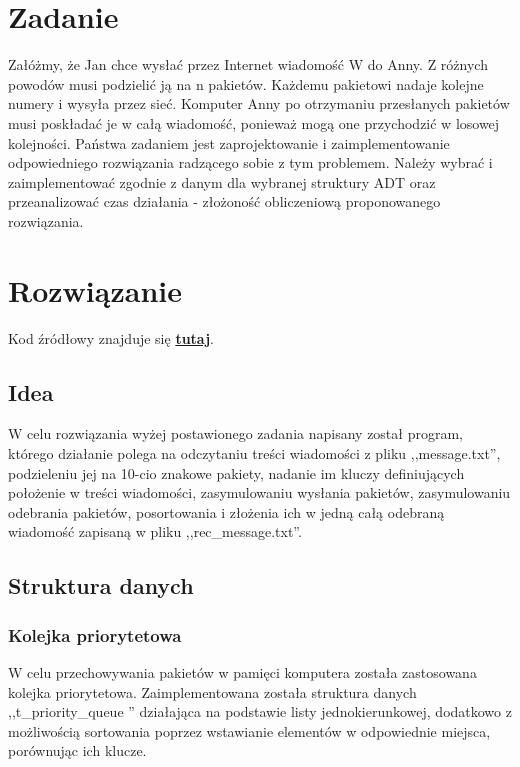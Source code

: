 \documentclass[12pt]{article}
\begin{document}
    


\section{Zadanie}


Załóżmy, że Jan chce wysłać przez Internet wiadomość W do Anny. Z różnych powodów musi podzielić
ją na n pakietów. Każdemu pakietowi nadaje kolejne numery i wysyła przez sieć. Komputer Anny po otrzymaniu
przesłanych pakietów musi poskładać je w całą wiadomość, ponieważ mogą one przychodzić w losowej
kolejności. Państwa zadaniem jest zaprojektowanie i zaimplementowanie odpowiedniego rozwiązania radzącego
sobie z tym problemem. Należy wybrać i zaimplementować zgodnie z danym dla wybranej struktury
ADT oraz przeanalizować czas działania - złożoność obliczeniową proponowanego rozwiązania.

\section{Rozwiązanie}

Kod źródłowy znajduje się  \href{https://github.com/PartyKusZ/PAMSI}{\textbf{tutaj}}.

\subsection{Idea}

W celu rozwiązania wyżej postawionego zadania napisany został program, którego działanie polega na odczytaniu treści wiadomości z pliku ,,message.txt'',
podzieleniu jej na 10-cio znakowe pakiety, nadanie im kluczy definiujących położenie w treści wiadomości, zasymulowaniu wysłania pakietów, zasymulowaniu 
odebrania pakietów, posortowania i złożenia ich w jedną całą odebraną wiadomość zapisaną w pliku ,,rec\_message.txt''.

\subsection{Struktura danych}

\subsubsection{Kolejka priorytetowa}

W celu przechowywania pakietów w pamięci komputera została zastosowana kolejka priorytetowa. Zaimplementowana została struktura danych ,,t\_priority\_queue '' działająca na podstawie listy jednokierunkowej, dodatkowo z możliwością sortowania 
poprzez wstawianie elementów w odpowiednie miejsca, porównując ich klucze.
\end{document}
